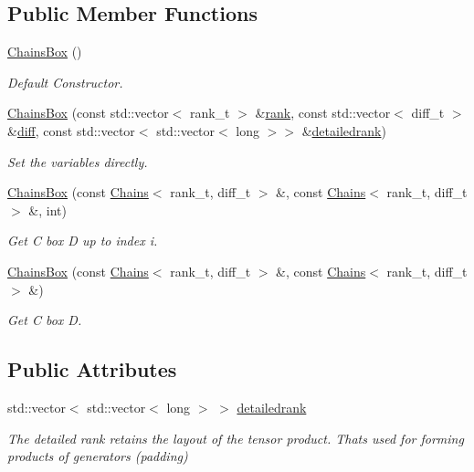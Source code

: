 \subsection*{Public Member Functions}
\begin{DoxyCompactItemize}
\item 
\hyperlink{classMackey_1_1ChainsBox_aa5b4853612f378261b6d321da748f576}{Chains\+Box} ()
\begin{DoxyCompactList}\small\item\em Default Constructor. \end{DoxyCompactList}\item 
\hyperlink{classMackey_1_1ChainsBox_a7b0d2b56b2d775cc3776c45150eb1997}{Chains\+Box} (const std\+::vector$<$ rank\+\_\+t $>$ \&\hyperlink{classMackey_1_1Chains_ad041dff6f210ae5be4de0a3b076a4d95}{rank}, const std\+::vector$<$ diff\+\_\+t $>$ \&\hyperlink{classMackey_1_1Chains_a9ccee2cbb3daa1e82bab920aeef59516}{diff}, const std\+::vector$<$ std\+::vector$<$ long $>$$>$ \&\hyperlink{classMackey_1_1ChainsBox_ab4db0344f896a00119783d479af44ed0}{detailedrank})
\begin{DoxyCompactList}\small\item\em Set the variables directly. \end{DoxyCompactList}\item 
\hyperlink{classMackey_1_1ChainsBox_a5ad9aaa3181850b3e297e698ea8eb39f}{Chains\+Box} (const \hyperlink{classMackey_1_1Chains}{Chains}$<$ rank\+\_\+t, diff\+\_\+t $>$ \&, const \hyperlink{classMackey_1_1Chains}{Chains}$<$ rank\+\_\+t, diff\+\_\+t $>$ \&, int)
\begin{DoxyCompactList}\small\item\em Get C box D up to index i. \end{DoxyCompactList}\item 
\hyperlink{classMackey_1_1ChainsBox_a6e001d0c3284bc1abf6d101bc76ad109}{Chains\+Box} (const \hyperlink{classMackey_1_1Chains}{Chains}$<$ rank\+\_\+t, diff\+\_\+t $>$ \&, const \hyperlink{classMackey_1_1Chains}{Chains}$<$ rank\+\_\+t, diff\+\_\+t $>$ \&)
\begin{DoxyCompactList}\small\item\em Get C box D. \end{DoxyCompactList}\end{DoxyCompactItemize}
\subsection*{Public Attributes}
\begin{DoxyCompactItemize}
\item 
std\+::vector$<$ std\+::vector$<$ long $>$ $>$ \hyperlink{classMackey_1_1ChainsBox_ab4db0344f896a00119783d479af44ed0}{detailedrank}
\begin{DoxyCompactList}\small\item\em The detailed rank retains the layout of the tensor product. That\textquotesingle{}s used for forming products of generators (padding) \end{DoxyCompactList}\end{DoxyCompactItemize}


